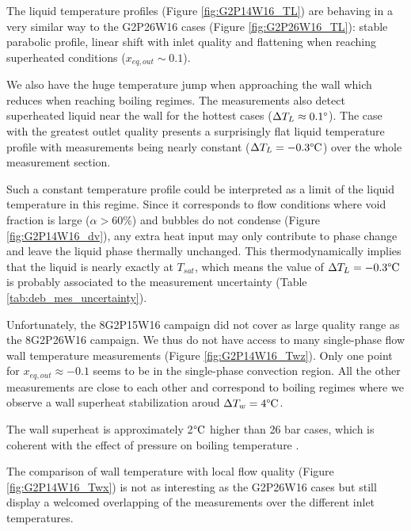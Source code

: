 \npar

The liquid temperature profiles (Figure \ref{fig:G2P14W16_TL}) are behaving in a very similar way to the G2P26W16 cases (Figure \ref{fig:G2P26W16_TL}): stable parabolic profile, linear shift with inlet quality and flattening when reaching superheated conditions ($x_{eq,out} \sim 0.1$).

We also have the huge temperature jump when approaching the wall which reduces when reaching boiling regimes. The measurements also detect superheated liquid near the wall for the hottest cases ($\Delta T_{L} \approx 0.1 \degree$). The case with the greatest outlet quality presents a surprisingly flat liquid temperature profile with measurements being nearly constant ($\Delta T_{L}=-0.3\degree\mathrm{C}$) over the whole measurement section. 

\begin{remark*}{}
Such a constant temperature profile could be interpreted as a limit of the liquid temperature in this regime. Since it corresponds to flow conditions where void fraction is large ($\alpha > 60\%$) and bubbles do not condense (Figure \ref{fig:G2P14W16_dv}), any extra heat input may only contribute to phase change and leave the liquid phase thermally unchanged. This thermodynamically implies that the liquid is nearly exactly at $T_{sat}$, which means the value of $\Delta T_{L}=-0.3\degree\mathrm{C}$ is probably associated to the measurement uncertainty (Table \ref{tab:deb_mes_uncertainty}).
\end{remark*}

\npar

Unfortunately, the 8G2P15W16 campaign did not cover as large quality range as the 8G2P26W16 campaign. We thus do not have access to many single-phase flow wall temperature measurements (Figure \ref{fig:G2P14W16_Twz}). Only one point for $x_{eq,out} \approx -0.1$ seems to be in the single-phase convection region. All the other measurements are close to each other and correspond to boiling regimes where we observe a wall superheat stabilization aroud $\Delta T_{w} = 4\degree\mathrm{C}$.

\begin{note*}{}
The wall superheat is approximately 2$\degree\mathrm{C}$ higher than 26 bar cases, which is coherent with the effect of pressure on boiling temperature \cite{hibiki_active_2003, kossolapov_experimental_2021}.
\end{note*} 

The comparison of wall temperature with local flow quality (Figure \ref{fig:G2P14W16_Twx}) is not as interesting as the G2P26W16 cases but still display a welcomed overlapping of the measurements over the different inlet temperatures.


